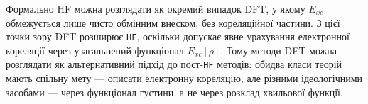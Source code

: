 \begin{commentbox}
Формально HF можна розглядати як окремий випадок DFT, у якому $E_{xc}$ обмежується лише чисто обмінним внеском, без кореляційної частини. З цієї точки зору DFT розширює \texttt{HF}, оскільки допускає явне урахування електронної кореляції через узагальнений функціонал $E_{xc}[\rho]$.
Тому методи DFT можна розглядати як альтернативний підхід до пост-\texttt{HF} методів: обидва класи теорій мають спільну мету --- описати електронну кореляцію, але різними ідеологічними засобами --- через функціонал густини, а не через розклад хвильової функції.
\end{commentbox}
